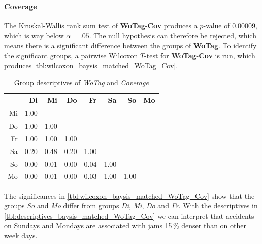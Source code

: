 \paragraph{Coverage}
The Kruskal-Wallis rank sum test of \textbf{WoTag}-\textbf{Cov} produces a $p$-value of 0.00009, which is way below $\alpha=.05$. The null hypothesis can therefore be rejected, which means there is a significant difference between the groups of \textbf{WoTag}. To identify the significant groups, a pairwise Wilcoxon $T$-test for \textbf{WoTag}-\textbf{Cov} is run, which produces \autoref{tbl:wilcoxon_baysis_matched_WoTag_Cov}. 
\begin{table}[ht]
	\small
	\centering
    \begin{tabular}{rrrrrrrr}
        \toprule
        & Di & Mi & Do & Fr & Sa & So & Mo \\ 
        \midrule
        Mi & 1.00 &  &  &  &  &  &  \\ 
        Do & 1.00 & 1.00 &  &  &  &  &  \\ 
        Fr & 1.00 & 1.00 & 1.00 &  &  &  &  \\ 
        Sa & 0.20 & 0.48 & 0.20 & 1.00 &  &  &  \\ 
        So & 0.00 & 0.01 & 0.00 & 0.04 & 1.00 &  &  \\ 
        Mo & 0.00 & 0.01 & 0.00 & 0.03 & 1.00 & 1.00 &  \\ 
        \bottomrule
      \end{tabular}
	\caption{Group descriptives of \textit{WoTag} and \textit{Coverage}}
	\label{tbl:wilcoxon_baysis_matched_WoTag_Cov}
\end{table}
The significances in \autoref{tbl:wilcoxon_baysis_matched_WoTag_Cov} show that the groups \textit{So} and \textit{Mo} differ from groups \textit{Di}, \textit{Mi}, \textit{Do} and \textit{Fr}. With the descriptives in \cref{tbl:descriptives_baysis_matched_WoTag_Cov} we can interpret that accidents on Sundays and Mondays are associated with jams 15\,\% denser than on other week days.
